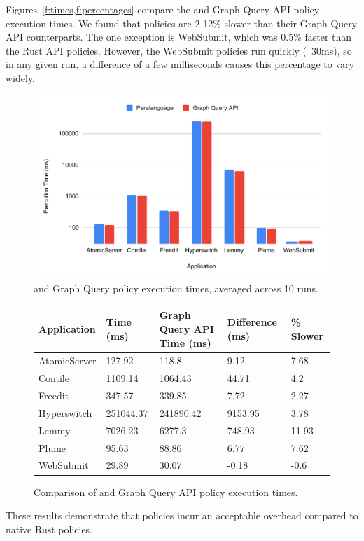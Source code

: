 Figures~\ref{f:times,f:percentages} compare the \syslang{} and Graph Query API policy execution times.
%
We found that \syslang{} policies are 2-12\% slower than their Graph Query API counterparts.
%
The one exception is WebSubmit, which was 0.5\% faster than the Rust API policies.
%
However, the WebSubmit policies run quickly (~30ms),
so in any given run, a difference of a few milliseconds causes this percentage to vary widely.
\begin{figure}
    \begin{centering}
        \includegraphics[scale=0.7]{graphics/times.pdf}
        \caption{\syslang{} and Graph Query policy execution times, averaged across 10 runs.}
        \label{f:times}
    \end{centering}
\end{figure}
%
\begin{figure}
    \begin{tabular}{|l|p{3cm}|p{3.5cm}|p{2cm}|p{3cm}|}
        \hline
        \textbf{Application} & \textbf{\syslang{} Time (ms)} & \textbf{Graph Query API Time (ms)} & \textbf{Difference (ms)} & \textbf{\syslang{} \% Slower} \\ \hline
        AtomicServer & 127.92    & 118.8     & 9.12    & 7.68  \\ \hline
        Contile      & 1109.14   & 1064.43   & 44.71   & 4.2   \\ \hline
        Freedit      & 347.57    & 339.85    & 7.72    & 2.27  \\ \hline
        Hyperswitch  & 251044.37 & 241890.42 & 9153.95 & 3.78  \\ \hline
        Lemmy        & 7026.23   & 6277.3    & 748.93  & 11.93 \\ \hline
        Plume        & 95.63     & 88.86     & 6.77    & 7.62  \\ \hline
        WebSubmit    & 29.89     & 30.07     & -0.18   & -0.6  \\ \hline               
        \end{tabular}
        \caption{Comparison of \syslang{} and Graph Query API policy execution times.}
        \label{f:percentages}
\end{figure}
%
These results demonstrate that \syslang{} policies incur an acceptable overhead compared to native Rust policies.
